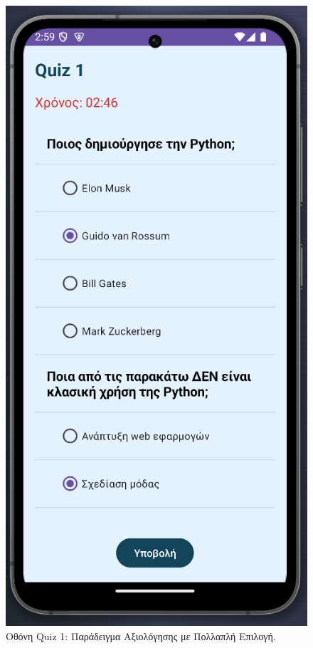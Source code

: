 \documentclass[11pt]{report}
\begin{document}
\begin{figure}[H]
  \centering
  \includegraphics[width=0.9\linewidth, height=0.35\textheight, keepaspectratio]{Figures/s7.png}
  \caption{Οθόνη Quiz 1: Παράδειγμα Αξιολόγησης με Πολλαπλή Επιλογή.}
\end{figure}
\end{document}
